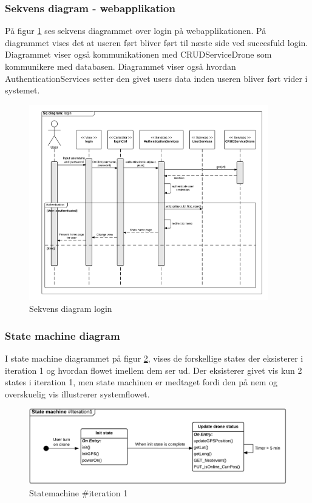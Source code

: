 \subsubsection*{Sekvens diagram - webapplikation}
På figur \ref{fig:Sekvens_diagram_login} ses sekvens diagrammet over login på webapplikationen. På diagrammet vises det at useren ført bliver ført til næste side ved succesfuld login. Diagrammet viser også kommunikationen med CRUDServiceDrone som kommunikere med databasen. Diagrammet viser også hvordan AuthenticationServices setter den givet users data inden useren bliver ført vider i systemet.
\begin{figure}[H]
	\centering
	\includegraphics[width=0.93\textwidth]{Billeder/sekvens/login_sq_diagram.png}
	\caption{Sekvens diagram login}
	\label{fig:Sekvens_diagram_login}
\end{figure}
\newpage

\subsubsection*{State machine diagram}
\vspace{-0.1cm}
I state machine diagrammet på figur \ref{fig:Statemachine_iteration1}, vises de forskellige states der eksisterer i iteration 1 og hvordan flowet imellem dem ser ud. Der eksisterer givet vis kun 2 states i iteration 1, men state machinen er medtaget fordi den på nem og overskuelig vis illustrerer systemflowet.
\begin{figure}[H]
	\centering
	\includegraphics[width=1\textwidth]{Billeder/statemachine/State_iteration1.png}
	\vspace{-0.5cm}
	\caption{Statemachine \#iteration 1}
	\label{fig:Statemachine_iteration1}
\end{figure}
\newpage

